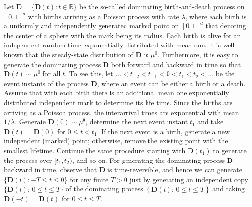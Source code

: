 \documentclass[11pt]{article}
\newcommand{\reals}{\mathbb{R}}
\newcommand{\wt}{\widetilde}
\begin{document}
\newcommand{\mD}{\mathbf{D}}
\newcommand{\mZ}{\mathbf{Z}}
\newcommand{\mU}{\mathbf{U}}
\newcommand{\mL}{\mathbf{L}}
Let $\mD = \{\mD(t): t \in \reals\}$ be the so-called dominating birth-and-death process on $[0,1]^d$ with births arriving as a Poisson process with rate $\lambda$, where each birth is a uniformly and independently generated marked point on $[0,1]^d$ that denoting the center of a sphere with the mark being its radius. Each birth is alive for an independent random time exponentially distributed with mean one. It is well known that the steady-state distribution of $\mD$ is $\mu^0$. 
Furthermore, it is easy to generate the dominating process $\mD$ both forward and backward in time so that ${\mD(t) \sim \mu^0}$ for all $t$. To see this, let ${\dots < t_{-2} < t_{-1} < 0 < t_1 < t_2 < \dots}$ be the event instants of the process $\mD$, where an event can be either a birth or a death. Assume that with each birth there is an additional mean one exponentially distributed independent mark to determine its life time. Since the births are arriving as a Poisson process, the interarrival times are exponential with mean $1/\lambda$. Generate ${\mD(0) \sim \mu^0}$, determine the next event instant $t_1$ and take ${\mD(t) = \mD(0)}$ for ${0\leq t < t_1}$. If the next event is a birth, generate a new independent (marked) point; otherwise, remove the existing point with the smallest lifetime. Continue the same procedure starting with $\mD(t_1)$ to generate the process over $[t_1, t_2)$, and so on.
For generating the dominating process $\mD$ backward in time, observe that $\mD$ is time-reversible, and hence we can generate
$\{\mD(t): -T \leq t \leq 0\}$ for any finite ${T > 0}$ just by generating an independent copy $\{\wt{\mD}(t):\, 0 \leq t \leq T\}$ of the dominating process $\left\{\mD(t):\, 0 \leq  t \leq T\right\}$
and taking ${\mD(-t) = \wt{\mD}(t)}$ for ${0 \leq t \leq T}$. \\
\end{document}
